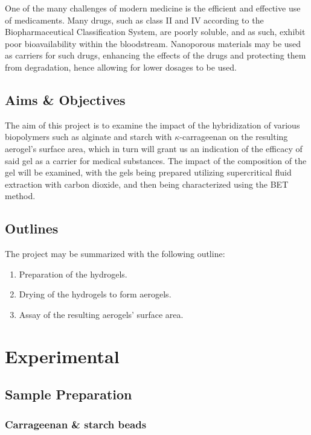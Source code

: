 \documentclass[a4paper,12pt]{article}
\begin{document}
One of the many challenges of modern medicine is the efficient and effective use of medicaments. Many drugs, such as class II and IV according to the Biopharmaceutical Classification System, are poorly soluble, and as such, exhibit poor bioavailability within the bloodstream. Nanoporous materials may be used as carriers for such drugs, enhancing the effects of the drugs and protecting them from degradation, hence allowing for lower dosages to be used.\supercite{ulker_emerging_2014}

\subsection{Aims \& Objectives}

The aim of this project is to examine the impact of the hybridization of various biopolymers such as alginate and starch with $\kappa$-carrageenan on the resulting aerogel's surface area, which in turn will grant us an indication of the efficacy of said gel as a carrier for medical substances. The impact of the composition of the gel will be examined, with the gels being prepared utilizing supercritical fluid extraction with carbon dioxide, and then being characterized using the BET method.

\subsection{Outlines}

The project may be summarized with the following outline:

\begin{enumerate}
	\item Preparation of the hydrogels.
	\item Drying of the hydrogels to form aerogels.
	\item Assay of the resulting aerogels' surface area.
\end{enumerate}

\pagebreak

\section{Experimental}

\subsection{Sample Preparation}

\subsubsection{Carrageenan \& starch beads}
\end{document}
